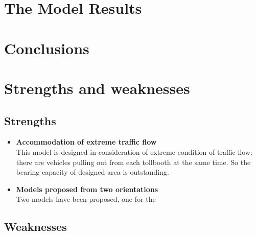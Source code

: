 \documentclass{mcmthesis}
\begin{document}
\section{The Model Results}




\section{Conclusions}


\section{Strengths and weaknesses}


\subsection{Strengths}
\begin{itemize}
\item \textbf{Accommodation of extreme traffic flow}\\ This model is designed in consideration of extreme condition of traffic flow: there are vehicles pulling out from each tollbooth at the same time. So the bearing capacity of designed area is outstanding.
\item \textbf{Models proposed from two orientations}\\ Two models have been proposed, one for the 

\end{itemize}
\subsection{Weaknesses}
\end{document}
